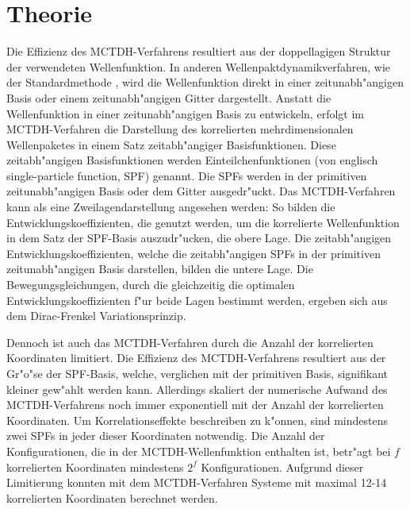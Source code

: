 \chapter{Theorie}


 Die Effizienz des MCTDH-Verfahrens resultiert aus der doppellagigen Struktur der verwendeten Wellenfunktion. In anderen Wellenpaktdynamikverfahren, 
wie der Standardmethode \cite{MCTDHreview3}, wird die Wellenfunktion direkt in einer zeitunabh"angigen Basis oder einem zeitunabh"angigen Gitter dargestellt. 
Anstatt die Wellenfunktion in einer zeitunabh"angigen Basis zu entwickeln,
erfolgt im MCTDH-Verfahren die Darstellung des korrelierten mehrdimensionalen Wellenpaketes in einem Satz zeitabh"angiger Basisfunktionen.
Diese zeitabh"angigen Basisfunktionen werden Einteilchenfunktionen (von englisch single-parti\-cle function, SPF) genannt. 
Die SPFs werden in der primitiven zeitunabh"angigen Basis oder dem Gitter ausgedr"uckt.
Das MCTDH-Verfahren kann als eine Zweilagendarstellung angesehen werden:
So bilden die Entwicklungskoeffizienten, die genutzt werden, um die korrelierte Wellenfunktion in dem Satz der SPF-Basis auszudr"ucken, die obere Lage.
Die zeitabh"angigen Entwicklungskoeffizienten, welche die zeitabh"angigen SPFs in der primitiven zeitunabh"angigen Basis darstellen, bilden die untere Lage.
Die Bewegungsgleichungen, durch die gleichzeitig die optimalen Entwicklungskoeffizienten f"ur beide Lagen bestimmt werden, ergeben sich aus dem Dirac-Frenkel Variationsprinzip.
   
Dennoch ist auch das MCTDH-Verfahren durch die Anzahl der korrelierten Koordinaten limitiert. 
Die Effizienz des MCTDH-Verfahrens resultiert aus der Gr"o"se der SPF-Basis, welche, verglichen mit der primitiven Basis, signifikant kleiner gew"ahlt werden kann.
Aller\-dings skaliert der numerische Aufwand des MCTDH-Verfahrens noch immer exponentiell mit der Anzahl der kor\-relierten Koordinaten.
Um Korrelationseffekte beschreiben zu k"onnen, sind mindestens zwei SPFs in jeder dieser Koordinaten notwendig.
Die Anzahl der Konfigurationen, die in der MCTDH-Wellenfunktion enthalten ist, betr"agt bei $ f $ kor\-relierten Koordinaten mindestens $ 2^f $ Konfigurationen.
Aufgrund dieser Limitierung konnten mit dem MCTDH-Verfahren Systeme mit maximal 12-14 korrelierten Koordinaten  berechnet werden.\cite{HM1, HM2, HM4, WWM, WWM2, HM5,
 WMC, BWHHM}
 
